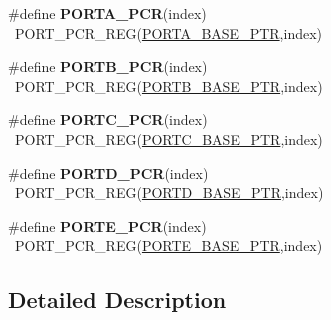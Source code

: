 \begin{DoxyCompactItemize}
\item 
\hypertarget{group___p_o_r_t___register___accessor___macros_ga35d4fd0500a0759697a40137dea62a41}{}\#define {\bfseries P\+O\+R\+T\+A\+\_\+\+P\+C\+R}(index)                                              ~P\+O\+R\+T\+\_\+\+P\+C\+R\+\_\+\+R\+E\+G(\hyperlink{group___p_o_r_t___peripheral_gaa18ec7594fe603225220ec6eda4a19ce}{P\+O\+R\+T\+A\+\_\+\+B\+A\+S\+E\+\_\+\+P\+T\+R},index)\label{group___p_o_r_t___register___accessor___macros_ga35d4fd0500a0759697a40137dea62a41}

\item 
\hypertarget{group___p_o_r_t___register___accessor___macros_ga551c76757a3ebc18de031a5e45bee678}{}\#define {\bfseries P\+O\+R\+T\+B\+\_\+\+P\+C\+R}(index)                                              ~P\+O\+R\+T\+\_\+\+P\+C\+R\+\_\+\+R\+E\+G(\hyperlink{group___p_o_r_t___peripheral_ga585b4782d1ceb44492289af0019480f9}{P\+O\+R\+T\+B\+\_\+\+B\+A\+S\+E\+\_\+\+P\+T\+R},index)\label{group___p_o_r_t___register___accessor___macros_ga551c76757a3ebc18de031a5e45bee678}

\item 
\hypertarget{group___p_o_r_t___register___accessor___macros_ga7eac1367167d119a0388f82fe7f8dd44}{}\#define {\bfseries P\+O\+R\+T\+C\+\_\+\+P\+C\+R}(index)                                              ~P\+O\+R\+T\+\_\+\+P\+C\+R\+\_\+\+R\+E\+G(\hyperlink{group___p_o_r_t___peripheral_ga03c740cdda17711afafc932723871474}{P\+O\+R\+T\+C\+\_\+\+B\+A\+S\+E\+\_\+\+P\+T\+R},index)\label{group___p_o_r_t___register___accessor___macros_ga7eac1367167d119a0388f82fe7f8dd44}

\item 
\hypertarget{group___p_o_r_t___register___accessor___macros_gac2a3e9731320fb291256347dfee6d6c5}{}\#define {\bfseries P\+O\+R\+T\+D\+\_\+\+P\+C\+R}(index)                                              ~P\+O\+R\+T\+\_\+\+P\+C\+R\+\_\+\+R\+E\+G(\hyperlink{group___p_o_r_t___peripheral_ga7f5a263751543810ebfdbde278383276}{P\+O\+R\+T\+D\+\_\+\+B\+A\+S\+E\+\_\+\+P\+T\+R},index)\label{group___p_o_r_t___register___accessor___macros_gac2a3e9731320fb291256347dfee6d6c5}

\item 
\hypertarget{group___p_o_r_t___register___accessor___macros_ga34d5c13bac091141ec60f381569ea24d}{}\#define {\bfseries P\+O\+R\+T\+E\+\_\+\+P\+C\+R}(index)                                              ~P\+O\+R\+T\+\_\+\+P\+C\+R\+\_\+\+R\+E\+G(\hyperlink{group___p_o_r_t___peripheral_gab166fe285bbb15b52de610f408fe25d3}{P\+O\+R\+T\+E\+\_\+\+B\+A\+S\+E\+\_\+\+P\+T\+R},index)\label{group___p_o_r_t___register___accessor___macros_ga34d5c13bac091141ec60f381569ea24d}

\end{DoxyCompactItemize}


\subsection{Detailed Description}
